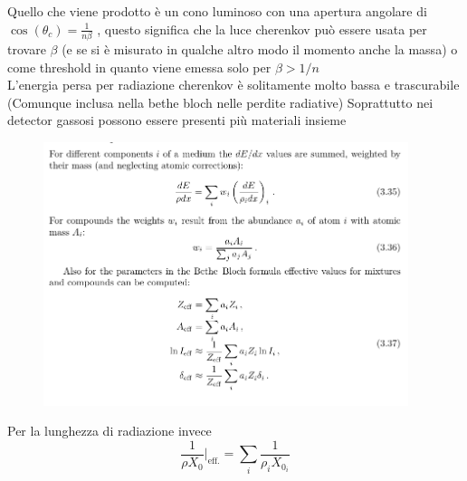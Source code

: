 Quello che viene prodotto è un cono luminoso con una apertura angolare di $\cos(\theta_c)=\frac{1}{n\beta}$ , questo significa che la luce cherenkov può essere usata per trovare $\beta$ (e se si è misurato in qualche altro modo il momento anche la massa) o come threshold in quanto viene emessa solo per $\beta>1/n$
\\
L'energia persa per radiazione cherenkov è solitamente molto bassa e trascurabile (Comunque inclusa nella bethe bloch nelle perdite radiative)
Soprattutto nei detector gassosi possono essere presenti più materiali insieme
\begin{figure}[H]
    \centering
    \includegraphics[width=0.95\textwidth,frame]{Chapters/images/Interazione_radiazione_materia/image-20220217042603821.png}
    \captionsetup{width=0.95\linewidth}
    \label{fig:misture}
\end{figure}
Per la lunghezza di radiazione invece \[\frac{1}{\rho X_0}|_{\text{eff.}}=\sum_i \frac{1}{\rho_i X_{0_i}}\]

